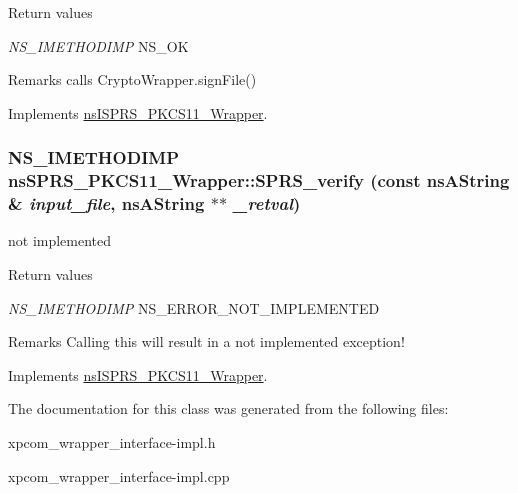 \begin{DoxyRetVals}{Return values}
\item[{\em NS\_\-IMETHODIMP}]NS\_\-OK \end{DoxyRetVals}
\begin{DoxyRemark}{Remarks}
calls CryptoWrapper.signFile() 
\end{DoxyRemark}


Implements \hyperlink{classnsISPRS__PKCS11__Wrapper}{nsISPRS\_\-PKCS11\_\-Wrapper}.\hypertarget{classnsSPRS__PKCS11__Wrapper_a592ec3f3125c461a48a66c4c88c9b118}{
\subsubsection[{SPRS\_\-verify}]{\setlength{\rightskip}{0pt plus 5cm}NS\_\-IMETHODIMP nsSPRS\_\-PKCS11\_\-Wrapper::SPRS\_\-verify (const nsAString \& {\em input\_\-file}, \/  nsAString $\ast$$\ast$ {\em \_\-retval})}}
\label{classnsSPRS__PKCS11__Wrapper_a592ec3f3125c461a48a66c4c88c9b118}


not implemented 
\begin{DoxyRetVals}{Return values}
\item[{\em NS\_\-IMETHODIMP}]NS\_\-ERROR\_\-NOT\_\-IMPLEMENTED \end{DoxyRetVals}
\begin{DoxyRemark}{Remarks}
Calling this will result in a not implemented exception! 
\end{DoxyRemark}


Implements \hyperlink{classnsISPRS__PKCS11__Wrapper}{nsISPRS\_\-PKCS11\_\-Wrapper}.

The documentation for this class was generated from the following files:\begin{DoxyCompactItemize}
\item 
xpcom\_\-wrapper\_\-interface-\/impl.h\item 
xpcom\_\-wrapper\_\-interface-\/impl.cpp\end{DoxyCompactItemize}
